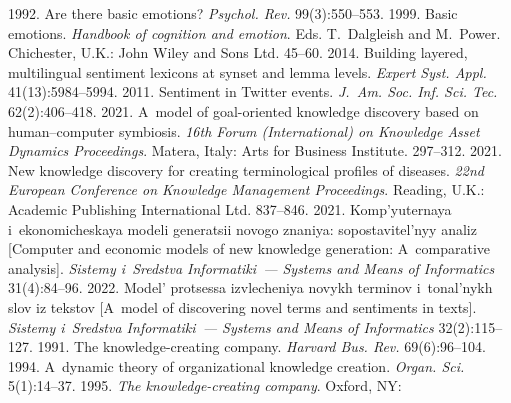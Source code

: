   \begin{multicols}{2}

\renewcommand{\bibname}{\protect\rmfamily References}

{\small\frenchspacing
 {%
 \begin{thebibliography}{99}
 
 \vspace*{-4pt}
 
 1992. Are there basic emotions? \textit{Psychol. Rev.} 99(3):550--553.
 1999. Basic emotions. \textit{Handbook of cognition and emotion}. Eds. 
T.~Dalgleish and M.~Power. Chichester, U.K.: John Wiley and Sons Ltd. 45--60.
 2014. Building layered, multilingual 
sentiment lexicons at synset and lemma levels. \textit{Expert Syst. Appl.}  
41(13):5984--5994.
 2011. Sentiment in Twitter events. \textit{J.~Am. 
Soc. Inf. Sci. Tec.} 62(2):406--418.
 2021. A~model of goal-oriented knowledge discovery based on human--computer 
symbiosis. \textit{16th Forum (International) on Knowledge Asset Dynamics Proceedings}. Matera, Italy: 
Arts for Business Institute. 297--312.
 2021. New knowledge discovery for creating terminological 
profiles of diseases. \textit{22nd European Conference on Knowledge Management Proceedings}. 
Reading, U.K.: Academic Publishing International Ltd. 837--846.
 2021. Komp'yuternaya i~ekonomicheskaya modeli generatsii novogo znaniya: 
sopostavitel'nyy ana\-liz [Computer and economic models of new knowledge generation: 
A~comparative analysis]. \textit{Sistemy i~Sredstva Informatiki~--- Systems and Means of 
Informatics} 31(4):84--96.
 2022. Model' protsessa izvlecheniya novykh terminov i~tonal'nykh slov iz tekstov 
[A~model of discovering novel terms and sentiments in texts]. \textit{Sistemy i~Sredstva  
Informatiki~--- Systems and Means of Informatics} 32(2):115--127.
 1991. The knowledge-creating company. \textit{Harvard Bus. Rev.} 69(6):96--104.
 1994. A~dynamic theory of organizational knowledge creation. \textit{Organ. Sci.} 
5(1):14--37.
 1995. \textit{The knowledge-creating company}. Oxford, NY: 

\end{thebibliography}}}
\end{multicols}
